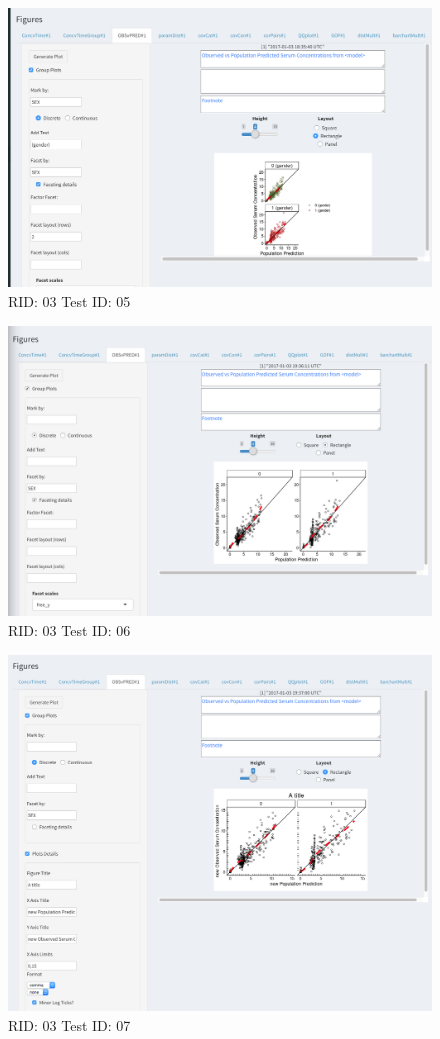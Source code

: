 \begin{figure}[H]
\includegraphics[width=.8\textwidth]{screencaps/03-05-1.png}
\caption{RID: 03 Test ID: 05}
\end{figure}
\begin{figure}[H]
\includegraphics[width=.8\textwidth]{screencaps/03-06-1.png}
\caption{RID: 03 Test ID: 06}
\end{figure}
\begin{figure}[H]
\includegraphics[width=.8\textwidth]{screencaps/03-07-1.png}
\caption{RID: 03 Test ID: 07}
\end{figure}

